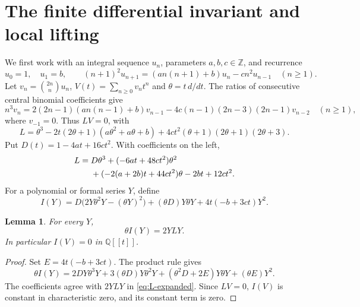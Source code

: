 \documentclass[11pt,a4paper]{article}
\newtheorem{lemma}[theorem]{Lemma}
\theoremstyle{remark}
\newcommand{\Z}{\mathbb Z}\newcommand{\Q}{\mathbb Q}
\begin{document}
\section{The finite differential invariant and local lifting}
\label{sec:invariant}
We first work with an integral sequence $u_n$, parameters $a,b,c\in\Z$,
and recurrence
\begin{equation}\label{eq:general-recurrence}
 u_0=1,\quad u_1=b,\qquad
 (n+1)^2u_{n+1}=(an(n+1)+b)u_n-cn^2u_{n-1}\quad(n\ge1).
\end{equation}
Let $v_n=\binom{2n}n u_n$, $V(t)=\sum_{n\ge0}v_nt^n$ and
$\theta=t\,d/dt$. The ratios of consecutive central binomial
coefficients give
\begin{equation}\label{eq:central-recurrence}
 n^3v_n=2(2n-1)(an(n-1)+b)v_{n-1}
 -4c(n-1)(2n-3)(2n-1)v_{n-2}\quad(n\ge1),
\end{equation}
where $v_{-1}=0$. Thus $LV=0$, with
\begin{equation}\label{eq:L}
 L=\theta^3-2t(2\theta+1)(a\theta^2+a\theta+b)
       +4ct^2(\theta+1)(2\theta+1)(2\theta+3).
\end{equation}
Put $D(t)=1-4at+16ct^2$. With coefficients on the left,
\begin{align}\label{eq:L-expanded}
 L={}&D\theta^3+(-6at+48ct^2)\theta^2\notag\\
 &+(-2(a+2b)t+44ct^2)\theta-2bt+12ct^2.
\end{align}
For a polynomial or formal series $Y$, define
\begin{equation}\label{eq:invariant}
 I(Y)=D\bigl(2Y\theta^2Y-(\theta Y)^2\bigr)
       +(\theta D)Y\theta Y+4t(-b+3ct)Y^2.
\end{equation}

\begin{lemma}\label{lem:Leibniz}
For every $Y$,
\begin{equation}\label{eq:Leibniz}
 \theta I(Y)=2YLY.
\end{equation}
In particular $I(V)=0$ in $\Q[[t]]$.
\end{lemma}
\begin{proof}
Set $E=4t(-b+3ct)$. The product rule gives
\[
 \theta I(Y)=2DY\theta^3Y+3(\theta D)Y\theta^2Y
 +(\theta^2D+2E)Y\theta Y+(\theta E)Y^2.
\]
The coefficients agree with $2YLY$ in \eqref{eq:L-expanded}.
Since $LV=0$, $I(V)$ is constant in characteristic zero, and its
constant term is zero.
\end{proof}
\end{document}

